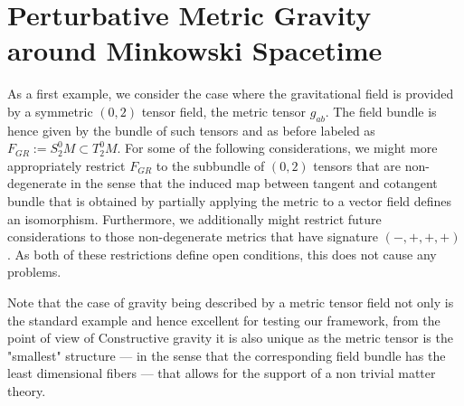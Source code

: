\section{Perturbative Metric Gravity around Minkowski Spacetime}
As a first example, we consider the case where the gravitational field is provided by a symmetric $(0,2)$ tensor field, the metric tensor $g_{ab}$. The field bundle is hence given by the bundle of such tensors and as before labeled as $F_{GR} := S^0_2M \subset T^0_2M$. For some of the following considerations, we might more appropriately restrict $F_{GR}$ to the subbundle of $(0,2)$ tensors that are non-degenerate in the sense that the induced map between tangent and cotangent bundle that is obtained by partially applying the metric to a vector field defines an isomorphism. Furthermore, we additionally might restrict future considerations to those non-degenerate metrics that have signature $(-,+,+,+)$. As both of these restrictions define open conditions, this does not cause any problems.

Note that the case of gravity being described by a metric tensor field not only is the standard example and hence excellent for testing our framework, from the point of view of Constructive gravity it is also unique as the metric tensor is the "smallest" structure --- in the sense that the corresponding field bundle has the least dimensional fibers --- that allows for the support of a non trivial matter theory.

